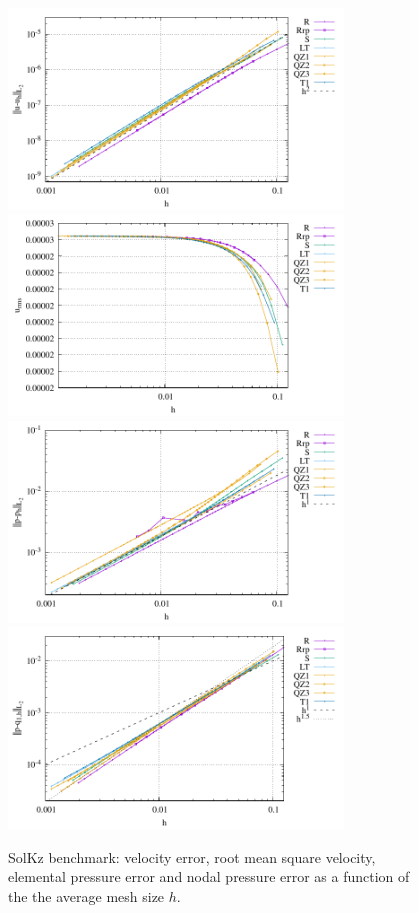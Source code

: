 \documentclass[a4paper,12pt]{article}
\begin{document}
\begin{figure}
\centering
\includegraphics[width=8.9cm]{../results/errors_u_exp5}
\includegraphics[width=8.9cm]{../results/vrms_exp5} \\
\includegraphics[width=8.9cm]{../results/errors_p_exp5}
\includegraphics[width=8.9cm]{../results/errors_q1_exp5}
\caption{SolKz benchmark: velocity error, 
root mean square velocity, elemental pressure error and nodal pressure error
as a function of the the average mesh size $h$.} 
\label{fig:ressolkz}
\end{figure}
\end{document}
